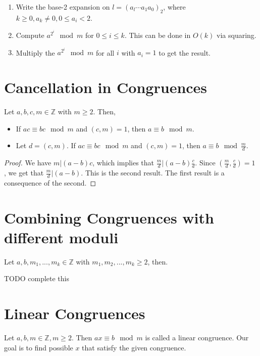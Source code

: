 \documentclass[12pt,letterpaper]{amsbook}
\theoremstyle{definition}
\newcommand{\Z}{\mathbb{Z}}
\begin{document}
\begin{enumerate}
  \item Write the base-2 expansion on $l = (a_l \cdots a_1 a_0)_2$, where $k \geq 0, a_k \neq 0, 0 \leq a_i < 2$.
  \item Compute $a^{2^i} \mod m$ for $0 \leq i \leq k$. This can be done in $O(k)$ via squaring.
  \item Multiply the $a^{2^i} \mod m$ for all $i$ with $a_i = 1$ to get the result.
\end{enumerate}

\section{Cancellation in Congruences}
\phantom{}
\begin{theorem}
  Let $a,b,c,m \in \Z$ with $m \geq 2$. Then,
  \begin{itemize}
    \item If $ac \equiv bc \mod m$ and $(c,m) = 1$, then $a \equiv b \mod m$.
    \item Let $d = (c,m)$. If $ac \equiv bc \mod m$ and $(c,m) = 1$, then $a \equiv b \mod \frac{m}{d}$.
  \end{itemize}
\end{theorem}
\begin{proof}
  We have $m | (a-b)c$, which implies that $\frac{m}{d} | (a-b) \frac{c}{d}$. Since $(\frac{m}{d},\frac{c}{d})= 1$ , we get that $\frac{m}{d} | (a-b)$. This is the second result. The first result is a consequence of the second.
\end{proof}

\section{Combining Congruences with different moduli}
\phantom{}
\begin{theorem}
  Let $a,b,m_1,...,m_k \in \Z$ with $m_1,m_2,...,m_k \geq 2$, then.
\end{theorem}

TODO complete this

\section{Linear Congruences}

Let $a,b,m \in \Z, m \geq 2$. Then $ax \equiv b \mod m$ is called a linear congruence. Our goal is to find possible $x$ that satisfy the given congruence.
\end{document}
